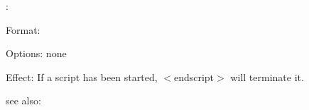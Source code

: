 \EndScript:

Format: 

Options: none

Effect: If a script has been started, $<$endscript$>$
        will terminate it.

see also: \script
